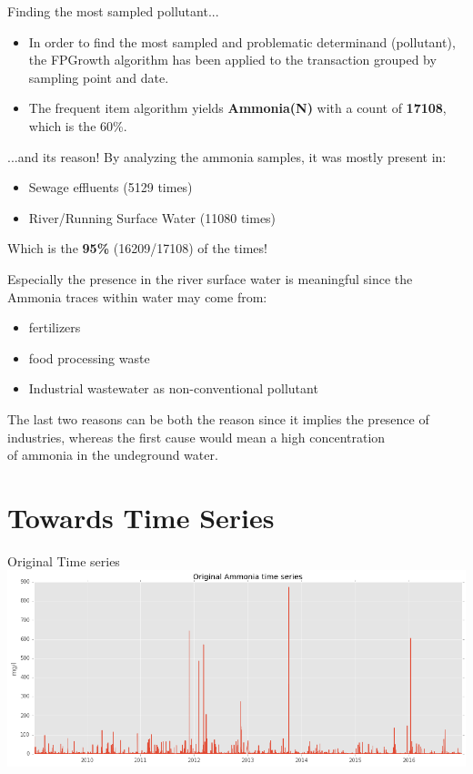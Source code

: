 \documentclass[british]{beamer}
\begin{document}
\begin{frame}{Finding the most sampled pollutant...}
	\begin{itemize}
		\item In order to find the most sampled and problematic determinand (pollutant), the FPGrowth algorithm has been applied to the transaction grouped by sampling point and date.
		
		\item The frequent item algorithm yields \textbf{Ammonia(N)} with a count of \textbf{17108}, which is the 60\%.
	\end{itemize}
\end{frame}

\begin{frame}{...and its reason!}
	By analyzing the ammonia samples, it was mostly present in:
	\begin{itemize}
		\item Sewage effluents (5129 times)
		\item River/Running Surface Water (11080 times)	
	\end{itemize}
	Which is the \textbf{95\%} (16209/17108) of the times!
	
	Especially the presence in the river surface water is meaningful since the Ammonia traces within water may come from:
	\begin{itemize}
		\item fertilizers
		\item food processing waste
		\item Industrial wastewater as non-conventional pollutant
	\end{itemize}
	
	The last two reasons can be both the reason since it implies the presence of industries, whereas the first cause would mean a high concentration  \\ of ammonia in the undeground water.
\end{frame}
	
\section{Towards Time Series}

\begin{frame}{Original Time series}
	\includegraphics[width=1\textwidth]{./Imgs/original_ts.png}
\end{frame}
\end{document}
